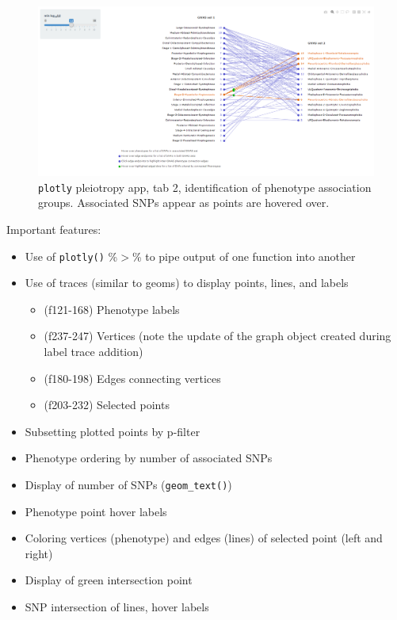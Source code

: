 \documentclass[10pt, letterpaper]{article}
\begin{document}
\begin{spacing}{1.0}
\begin{figure}[H]
    \includegraphics[width=6.5in, trim={0 0 0 0}, clip]{Tab2.png}
    \centering
    \caption{\texttt{plotly} pleiotropy app, tab 2, identification of phenotype association groups.  Associated SNPs appear as points are hovered over.}
    \label{fg:tab2}
\end{figure}

Important features:

\begin{itemize}
    \item Use of \texttt{plotly()} \%$>$\% to pipe output of one function into another
    \item Use of traces (similar to geoms) to display points, lines, and labels
    \begin{itemize}
        \item (f121-168) Phenotype labels
        \item (f237-247) Vertices (note the update of the graph object created during label trace addition)
        \item (f180-198) Edges connecting vertices
        \item (f203-232) Selected points
    \end{itemize}
    \item Subsetting plotted points by p-filter
    \item Phenotype ordering by number of associated SNPs
    \item Display of number of SNPs (\texttt{geom\_text()})
    \item Phenotype point hover labels
    \item Coloring vertices (phenotype) and edges (lines) of selected point (left and right)
    \item Display of green intersection point
    \item SNP intersection of lines, hover labels 
\end{itemize}


\end{spacing}
\end{document}
